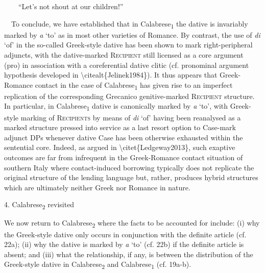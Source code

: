 \documentclass[output=paper,modfonts,nonflat]{langsci/langscibook}
\begin{document}
\begin{styleStandard}
\ \ \ \ “Let’s not shout at our children!”
\end{styleStandard}

\begin{styleStandard}
\ \ To conclude, we have established that in Calabrese\textsubscript{1} the dative is invariably marked by \textit{a }‘to’ as in most other varieties of Romance. By contrast, the use of \textit{di }‘of’ in the so-called Greek-style dative has been shown to mark right-peripheral adjuncts, with the dative-marked \textsc{Recipient} still licensed as a core argument (pro) in association with a coreferential dative clitic (cf. pronominal argument hypothesis developed in {\textbackslash}citealt\{Jelinek1984\}). It thus appears that Greek-Romance contact in the case of Calabrese\textsubscript{1} has given rise to an imperfect replication of the corresponding Grecanico genitive-marked \textsc{Recipient} structure. In particular, in Calabrese\textsubscript{1} dative is canonically marked by \textit{a }‘to’, with Greek-style marking of \textsc{Recipients} by means of \textit{di }‘of’ having been reanalysed as a marked structure pressed into service as a last resort option to Case-mark adjunct DPs whenever dative Case has been otherwise exhausted within the sentential core. Indeed, as argued in {\textbackslash}citet\{Ledgeway2013\}, such exaptive outcomes are far from infrequent in the Greek-Romance contact situation of southern Italy where contact-induced borrowing typically does not replicate the original structure of the lending language but, rather, produces hybrid structures which are ultimately neither Greek nor Romance in nature.
\end{styleStandard}

\begin{styleStandard}
4. Calabrese\textsubscript{2} revisited
\end{styleStandard}

\begin{styleStandard}
We now return to Calabrese\textsubscript{2} where the facts to be accounted for include: (i) why the Greek-style dative only occurs in conjunction with the definite article (cf. 22a); (ii) why the dative is marked by \textit{a }‘to’ (cf. 22b) if the definite article is absent; and (iii) what the relationship, if any, is between the distribution of the Greek-style dative in Calabrese\textsubscript{2} and Calabrese\textsubscript{1} (cf. 19a-b). 
\end{styleStandard}
\end{document}
